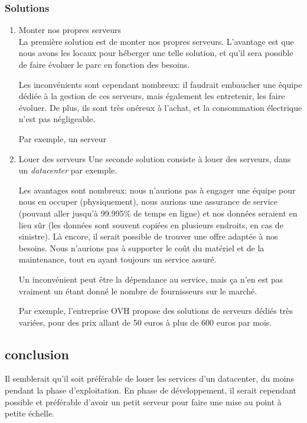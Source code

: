     \subsubsection{Solutions}
        \begin{enumerate}
            \item Monter nos propres serveurs\\
            La première solution est de monter nos propres serveurs.
            L'avantage est que nous avons les locaux pour héberger une
            telle solution, et qu'il sera possible de faire évoluer
            le parc en fonction des besoins.
    
            Les inconvénients sont cependant nombreux: il faudrait
            embaucher une équipe dédiée à la gestion de ces serveurs,
            mais également les entretenir,
            les faire évoluer. De plus, ils sont très onéreux à l'achat,
            et la consommation électrique n'est pas négligeable.
            
            Par exemple, un serveur

            \item Louer des serveurs
            Une seconde solution consiste à louer des serveurs,
            dans un \textsl{datacenter} par exemple.

            Les avantages sont nombreux: nous n'aurions pas
            à engager une équipe pour
            nous en occuper (physiquement), nous aurions une
            assurance de service
            (pouvant aller jusqu'à 99.995\% de temps en ligne)
            et nos données seraient
            en lieu sûr (les données sont souvent copiées en
            plusieurs endroits, en cas de sinistre). Là encore,
            il serait possible de trouver une offre adaptée à nos besoins.
            Nous n'aurions pas à supporter le coût du matériel et de la 
            maintenance, tout en ayant toujours un service assuré.

            Un inconvénient peut être la dépendance au service, mais ça
            n'en est pas vraiment un étant donné le nombre de
            fournisseurs sur le marché.

            Par exemple, l'entreprise OVH propose des solutions
            de serveurs dédiés très variées, pour des prix allant
            de 50 euros à plus de 600 euros par mois.



        \end{enumerate}
    \subsection{conclusion}
    Il semblerait qu'il soit préférable de louer les services d'un datacenter, du moins pendant la phase d'exploitation. En phase de développement,
il serait cependant possible et préférable d'avoir un petit serveur pour faire une mise au point à petite échelle.
%
\vfill
\pagebreak
